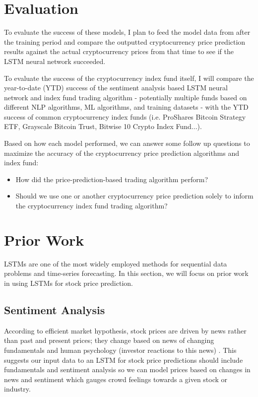 \documentclass[10pt,twocolumn]{article}
\begin{document}
\section{Evaluation}

To evaluate the success of these models, I plan to feed the model data from after the training period and compare the outputted cryptocurrency price prediction results against the actual cryptocurrency prices from that time to see if the LSTM neural network succeeded.

To evaluate the success of the cryptocurrency index fund itself, I will compare the year-to-date (YTD) success of the sentiment analysis based LSTM neural network and index fund trading algorithm - potentially multiple funds based on different NLP algorithms, ML algorithms, and training datasets - with the YTD success of common cryptocurrency index funds (i.e. ProShares Bitcoin Strategy ETF, Grayscale Bitcoin Trust, Bitwise 10 Crypto Index Fund...).

Based on how each model performed, we can answer some follow up questions to maximize the accuracy of the cryptocurrency price prediction algorithms and index fund:

\begin{itemize}
    \item How did the price-prediction-based trading algorithm perform?
    \item Should we use one or another cryptocurrency price prediction solely to inform the cryptocurrency index fund trading algorithm?
\end{itemize}

\section{Prior Work}

LSTMs are one of the most widely employed methods for sequential data problems and time-series forecasting. In this section, we will focus on prior work in using LSTMs for stock price prediction.

\subsection{Sentiment Analysis}

According to efficient market hypothesis, stock prices are driven by news rather than past and present prices; they change based on news of changing fundamentals and human psychology (investor reactions to this news) \cite{LSTMSentimentAnalysis}. This suggests our input data to an LSTM for stock price predictions should include fundamentals and sentiment analysis so we can model prices based on changes in news and sentiment which gauges crowd feelings towards a given stock or industry.
\end{document}
